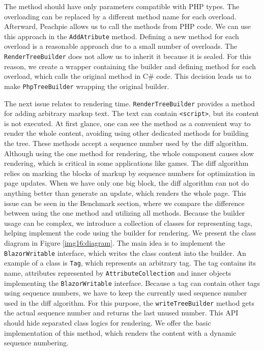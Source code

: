 The method should have only parameters compatible with PHP types. 
The overloading can be replaced by a different method name for each overload.
Afterward, Peachpie allows us to call the methods from PHP code.
We can use this approach in the \texttt{AddAtribute} method. 
Defining a new method for each overload is a reasonable approach due to a small number of overloads.
The \texttt{RenderTreeBuilder} does not allow us to inherit it because it is sealed.
For this reason, we create a wrapper containing the builder and defining method for each overload, which calls the original method in C\# code.
This decision leads us to make \texttt{PhpTreeBuilder} wrapping the original builder.
\par
The next issue relates to rendering time.
\texttt{RenderTreeBuilder} provides a method for adding arbitrary markup text.
The text can contain \texttt{<script>}, but its content is not executed.
At first glance, one can see the method as a convenient way to render the whole content, avoiding using other dedicated methods for building the tree.
These methods accept a sequence number used by the diff algorithm. 
Although using the one method for rendering, the whole component causes slow rendering, which is critical in some applications like games.
The diff algorithm relies on marking the blocks of markup by sequence numbers for optimization in page updates.
When we have only one big block, the diff algorithm can not do anything better than generate an update, which renders the whole page. 
This issue can be seen in the Benchmark section, where we compare the difference between using the one method and utilizing all methods.
Because the builder usage can be complex, we introduce a collection of classes for representing tags, helping implement the code using the builder for rendering.
We present the class diagram in Figure \ref{img16:diagram}.
The main idea is to implement the \texttt{BlazorWritable} interface, which writes the class content into the builder.
An example of a class is \texttt{Tag}, which represents an arbitrary tag.
The tag contains its name, attributes represented by \texttt{AttributeCollection} and inner objects implementing the \texttt{BlazorWritable} interface.
Because a tag can contain other tags using sequence numbers, we have to keep the currently used sequence number used in the diff algorithm.
For this purpose, the \texttt{writeTreeBuilder} method gets the actual sequence number and returns the last unused number.
This API should hide separated class logics for rendering.
We offer the basic implementation of this method, which renders the content with a dynamic sequence numbering. 
